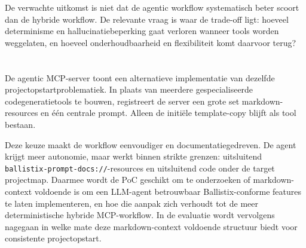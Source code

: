 De verwachte uitkomst is niet dat de agentic workflow systematisch beter scoort dan de hybride workflow. De relevante vraag is waar de trade-off ligt: hoeveel determinisme en hallucinatiebeperking gaat verloren wanneer tools worden weggelaten, en hoeveel onderhoudbaarheid en flexibiliteit komt daarvoor terug?

\section{}
\label{sec:poc-agentic-samenvatting}

De agentic MCP-server toont een alternatieve implementatie van dezelfde projectopstartproblematiek. In plaats van meerdere gespecialiseerde codegeneratietools te bouwen, registreert de server een grote set markdown-resources en één centrale prompt. Alleen de initiële template-copy blijft als tool bestaan.

Deze keuze maakt de workflow eenvoudiger en documentatiegedreven. De agent krijgt meer autonomie, maar werkt binnen strikte grenzen: uitsluitend \texttt{ballistix-prompt-docs://}-resources en uitsluitend code onder de target projectmap. Daarmee wordt de PoC geschikt om te onderzoeken of markdown-context voldoende is om een LLM-agent betrouwbaar Ballistix-conforme features te laten implementeren, en hoe die aanpak zich verhoudt tot de meer deterministische hybride MCP-workflow. In de evaluatie wordt vervolgens nagegaan in welke mate deze markdown-context voldoende structuur biedt voor consistente projectopstart.
